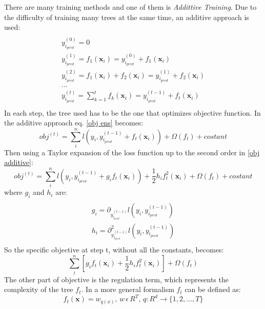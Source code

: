 \documentclass[a4paper, oneside, 11pt, openright]{book}
\begin{document}
			There are many training methods and one of them is \textit{Addittive Training}. Due to the difficulty of training many trees at the same time, an additive approach is used:
			\begin{multline}
				\\y_{i_{pred}}^{(0)} = 0 \\
				y_{i_{pred}}^{(1)} = f_1(\textbf{x}_i) = y_{i_{pred}}^{(0)} + f_1(\textbf{x}_i) \\
				y_{i_{pred}}^{(2)} = f_1(\textbf{x}_i) + f_2(\textbf{x}_i)= y_{i_{pred}}^{(1)} + f_2(\textbf{x}_i) \\	
				...\\
				y_{i_{pred}}^{(t)} = \sum_{k=1}^{t}f_k(\textbf{x}_i) = y_{i_{pred}}^{(t-1)} + f_t(\textbf{x}_i)\\		
				\label{y additive}	
			\end{multline}
			In each step, the tree used has to be the one that optimizes objective function. In the additive approach eq. \eqref{obj ens} becomes:
			\begin{equation}
				obj^{(t)} =  \sum_{i}^{n}l(y_i,y_{i_{pred}}^{(t-1)}+f_t(\textbf{x}_i)) + \Omega(f_t) +costant
				\label{obj additive}	
			\end{equation}
			Then using a Taylor expansion of the loss function up to the second order in \eqref{obj additive}: 
			\begin{equation}
			obj^{(t)} = \sum_{i}^{n}l(y_i,y_{i_{pred}}^{(t-1)}+g_if_t(\textbf{x}_i)) +\frac{1}{2}h_if_t^2(\textbf{x}_i) + \Omega(f_t) +costant
			\label{obj taylor}	
			\end{equation}
			where $g_i$ and $h_i$ are:
			\begin{multline}
				\\g_i = \partial_{y_{i_{pred}}^{(t-1)}} l(y_i,y_{i_{pred}}^{(t-1)})\\
				h_i = \partial_{y_{i_{pred}}^{(t-1)}}^2 l(y_i,y_{i_{pred}}^{(t-1)})\\
				\label{g and h}	
			\end{multline}
			So the specific objective at step t, without all the constants, becomes:
			\begin{equation}
				\sum_{i}^{n}[g_if_t(\textbf{x}_i) + \frac{1}{2}h_i f_t^2(\textbf{x}_i)] + \Omega(f_t)
				\label{spec obj}
			\end{equation}
			The other part of objective is the regulation term, which represents the complexity of the tree $f_t$. In a more general formalism $f_t$ can be defined as:
			\begin{equation}
				f_t(\textbf{x}) = w_{q(x)}, \, w\,\epsilon\, R^T, \, q:R^d \rightarrow \{1,2,...,T\}
				\label{tree in math}
			\end{equation}
\end{document}
